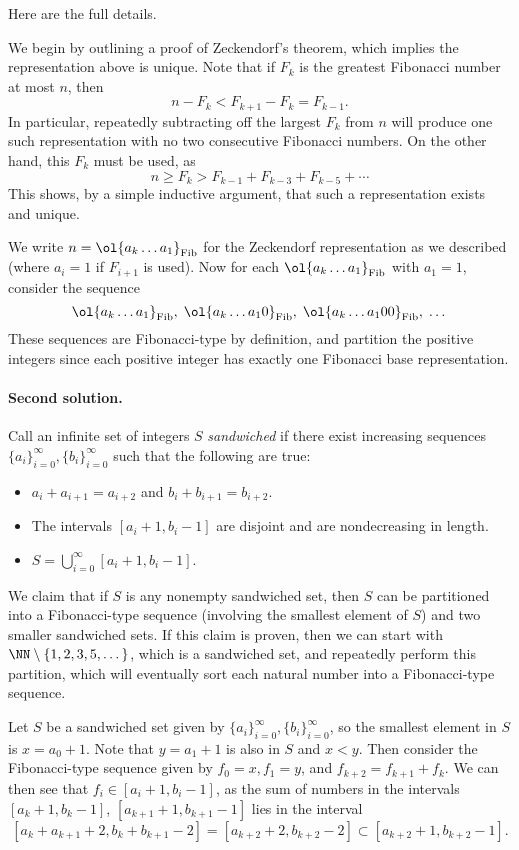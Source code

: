 \documentclass[11pt]{scrartcl}
\begin{document}
Here are the full details.

We begin by outlining a proof of Zeckendorf's theorem,
which implies the representation above is unique.
Note that if $F_k$ is the greatest Fibonacci number at most $n$,
then \[n - F_k < F_{k+1} - F_{k} = F_{k-1}.\]
In particular, repeatedly subtracting off the largest $F_k$
from $n$ will produce one such representation with
no two consecutive Fibonacci numbers.
On the other hand, this $F_k$ must be used, as
\[ n \ge F_k > F_{k-1} + F_{k-3} + F_{k-5} + \dotsb \]
This shows, by a simple inductive argument,
that such a representation exists and unique.

We write $n = \ol{a_k\dotso a_1}_{\text{Fib}}$
for the Zeckendorf representation as we described
(where $a_i = 1$ if $F_{i+1}$ is used).
Now for each $\ol{a_k\dotso a_1}_{\text{Fib}}$
with $a_1 = 1$, consider the sequence
\[ \ol{a_k\dotso a_1}_{\text{Fib}}, \;
  \ol{a_k\dotso a_1 0}_{\text{Fib}}, \;
  \ol{a_k\dotso a_1 00}_{\text{Fib}}, \; \dots \]
These sequences are Fibonacci-type by definition,
and partition the positive integers since
each positive integer has exactly one Fibonacci base representation.

\paragraph{Second solution.} Call an infinite set of integers $S$ \textit{sandwiched} if there exist increasing sequences $\{a_i\}_{i=0}^{\infty}, \{b_i\}_{i=0}^{\infty}$ such that the following are true:
\begin{itemize}
\item $a_i + a_{i+1} = a_{i+2}$ and $b_i + b_{i+1} = b_{i+2}$.
\item The intervals $[a_i+1,b_i-1]$ are disjoint and are nondecreasing in length.
\item $\displaystyle S = \bigcup_{i=0}^{\infty} [a_i+1,b_i-1]$.
\end{itemize}

We claim that if $S$ is any nonempty sandwiched set, then $S$ can be partitioned into a Fibonacci-type sequence (involving the smallest element of $S$) and two smaller sandwiched sets. If this claim is proven, then we can start with $\NN \setminus \{1,2,3,5,\dots\}$, which is a sandwiched set, and repeatedly perform this partition, which will eventually sort each natural number into a Fibonacci-type sequence.

Let $S$ be a sandwiched set given by $\{a_i\}_{i=0}^{\infty}, \{b_i\}_{i=0}^{\infty}$, so the smallest element in $S$ is $x = a_0 + 1$. Note that $y = a_1+1$ is also in $S$ and $x < y$. Then consider the Fibonacci-type sequence given by $f_0 = x, f_1 = y$, and $f_{k+2} = f_{k+1} + f_k$. We can then see that $f_i \in [a_i+1,b_i-1]$, as the sum of numbers in the intervals $[a_{k}+1,b_{k}-1]$, $[a_{k+1}+1,b_{k+1}-1]$ lies in the interval \[[a_{k} + a_{k+1} + 2,b_k + b_{k+1}-2] = [a_{k+2}+2,b_{k+2}-2] \subset [a_{k+2}+1,b_{k+2}-1].\]
\end{document}
